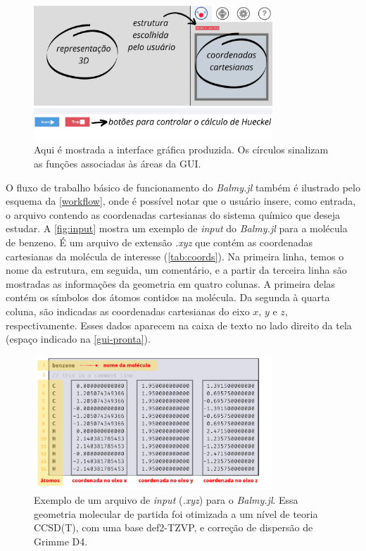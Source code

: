 \begin{figure}[htb]
	\caption{\label{gui-pronta} Aqui é mostrada a interface gráfica produzida. Os círculos sinalizam as funções associadas às áreas da \gls{GUI}.}
	\begin{center}
		\includegraphics[width=0.8\textwidth]{images/GUI-EXAMPLE.png}
	\end{center}
\end{figure}

O fluxo de trabalho básico de funcionamento do \textit{Balmy.jl} também é ilustrado pelo esquema da \autoref{workflow}, onde é possível notar que o usuário insere, como entrada, o arquivo contendo as coordenadas cartesianas do sistema químico que deseja estudar. A \autoref{fig:input} mostra um exemplo de \textit{input} do \textit{Balmy.jl} para a molécula de benzeno. É um arquivo de extensão \textit{.xyz} que contém as coordenadas cartesianas da molécula de interesse (\autoref{tab:coords}). Na primeira linha, temos o nome da estrutura, em seguida, um comentário, e a partir da terceira linha são mostradas as informações da geometria em quatro colunas. A primeira delas contém os símbolos dos átomos contidos na molécula. Da segunda à quarta coluna, são indicadas as coordenadas cartesianas do eixo $x$, $y$ e $z$, respectivamente. Esses dados aparecem na caixa de texto no lado direito da tela (espaço indicado na \autoref{gui-pronta}).

\begin{figure}[htb]
	\caption{\label{fig:input} Exemplo de um arquivo de \textit{input} (\textit{.xyz}) para o \textit{Balmy.jl}. Essa geometria molecular de partida foi otimizada a um nível de teoria CCSD(T), com uma base def2-TZVP, e correção de dispersão de Grimme D4.}
	\begin{center}
		\includegraphics[width=0.8\textwidth]{images/fig2(4).png}
	\end{center}
\end{figure}

